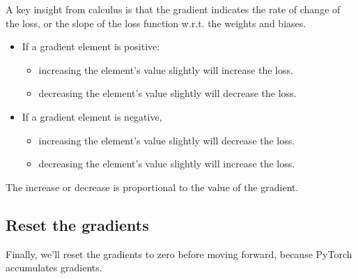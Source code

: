 \documentclass[]{book}
\newenvironment{Shaded}{\begin{snugshade}}{\end{snugshade}}
\newcommand{\CommentTok}[1]{\textcolor[rgb]{0.56,0.35,0.01}{\textit{#1}}}
\newcommand{\KeywordTok}[1]{\textcolor[rgb]{0.13,0.29,0.53}{\textbf{#1}}}
\newcommand{\NormalTok}[1]{#1}
\newcommand{\OperatorTok}[1]{\textcolor[rgb]{0.81,0.36,0.00}{\textbf{#1}}}
\providecommand{\tightlist}{%
  \setlength{\itemsep}{0pt}\setlength{\parskip}{0pt}}
\begin{document}
A key insight from calculus is that the gradient indicates the rate of change of the loss, or the slope of the loss function w.r.t. the weights and biases.

\begin{itemize}
\tightlist
\item
  If a gradient element is positive:

  \begin{itemize}
  \tightlist
  \item
    increasing the element's value slightly will increase the loss.
  \item
    decreasing the element's value slightly will decrease the loss.
  \end{itemize}
\item
  If a gradient element is negative,

  \begin{itemize}
  \tightlist
  \item
    increasing the element's value slightly will decrease the loss.
  \item
    decreasing the element's value slightly will increase the loss.
  \end{itemize}
\end{itemize}

The increase or decrease is proportional to the value of the gradient.

\hypertarget{reset-the-gradients}{%
\subsection{Reset the gradients}\label{reset-the-gradients}}

Finally, we'll reset the gradients to zero before moving forward, because PyTorch accumulates gradients.

\begin{Shaded}
\end{Shaded}
\end{document}
